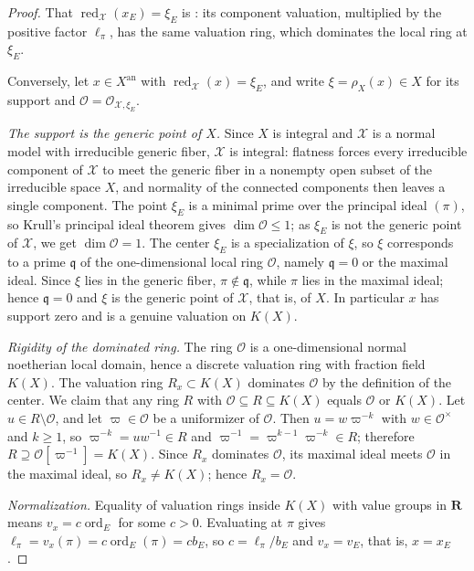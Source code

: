 \begin{proof}
That $\operatorname{red}_{\mathcal X}(x_E)=\xi_E$ is
: its component valuation, multiplied by
the positive factor $\ell_\pi$, has the same valuation ring, which
dominates the local ring at $\xi_E$.

Conversely, let $x\in X^{\mathrm{an}}$ with
$\operatorname{red}_{\mathcal X}(x)=\xi_E$, and write
$\xi=\rho_X(x)\in X$ for its support and
$\mathcal O=\mathcal O_{\mathcal X,\xi_E}$.

\emph{The support is the generic point of $X$.}
Since $X$ is integral and $\mathcal X$ is a normal model with
irreducible generic fiber, $\mathcal X$ is integral: flatness forces
every irreducible component of $\mathcal X$ to meet the generic fiber
in a nonempty open subset of the irreducible space $X$, and normality
of the connected components then leaves a single component.  The point
$\xi_E$ is a minimal prime over the principal ideal $(\pi)$, so Krull's
principal ideal theorem gives $\dim\mathcal O\le 1$; as $\xi_E$ is not
the generic point of $\mathcal X$, we get $\dim\mathcal O=1$.  The
center $\xi_E$ is a specialization of $\xi$, so $\xi$ corresponds
to a prime $\mathfrak q$ of the one-dimensional local ring
$\mathcal O$, namely $\mathfrak q=0$ or the maximal ideal.  Since
$\xi$ lies in the generic fiber, $\pi\notin\mathfrak q$, while
$\pi$ lies in the maximal ideal; hence $\mathfrak q=0$ and $\xi$
is the generic point of $\mathcal X$, that is, of $X$.  In
particular $x$ has support zero and is a genuine valuation on
$K(X)$.

\emph{Rigidity of the dominated ring.}
The ring $\mathcal O$ is a one-dimensional normal noetherian local
domain, hence a discrete valuation ring with fraction field $K(X)$.
The valuation ring $R_x\subset K(X)$ dominates $\mathcal O$ by the
definition of the center.  We claim that any ring $R$ with
$\mathcal O\subseteq R\subseteq K(X)$ equals $\mathcal O$ or
$K(X)$.  Let $u\in R\setminus\mathcal O$, and let
$\varpi\in\mathcal O$ be a uniformizer of $\mathcal O$.  Then
$u=w\varpi^{-k}$ with $w\in\mathcal O^\times$ and $k\geq1$, so
$\varpi^{-k}=uw^{-1}\in R$ and
$\varpi^{-1}=\varpi^{k-1}\varpi^{-k}\in R$; therefore
$R\supseteq\mathcal O[\varpi^{-1}]=K(X)$.  Since $R_x$ dominates
$\mathcal O$, its maximal ideal meets $\mathcal O$ in the maximal
ideal, so $R_x\neq K(X)$; hence $R_x=\mathcal O$.

\emph{Normalization.}
Equality of valuation rings inside $K(X)$ with value groups in
$\mathbf R$ means $v_x=c\operatorname{ord}_E$ for some $c>0$.
Evaluating at $\pi$ gives
$\ell_\pi=v_x(\pi)=c\operatorname{ord}_E(\pi)=cb_E$, so
$c=\ell_\pi/b_E$ and
$v_x=v_E$, that is, $x=x_E$.
\end{proof}

